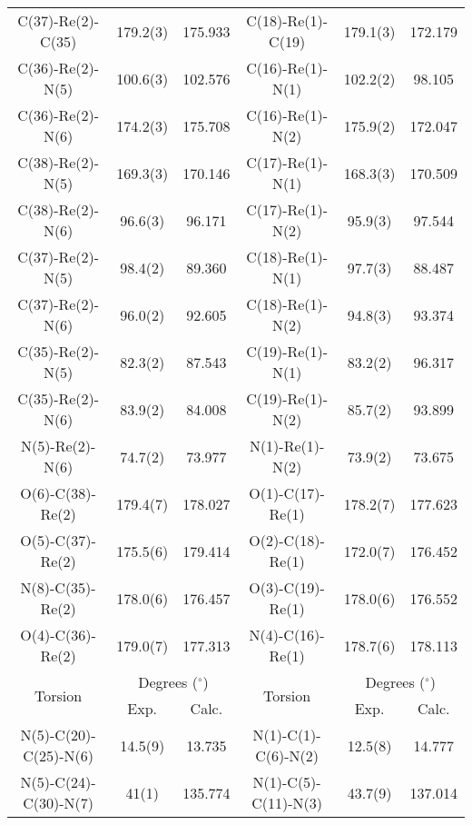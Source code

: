 \begin{table}[htbp]
\begin{tabular}{cccccc}
    C(37)-Re(2)-C(35) & 179.2(3) & 175.933 & C(18)-Re(1)-C(19) & 179.1(3) & 172.179 \\
    C(36)-Re(2)-N(5) & 100.6(3) & 102.576 & C(16)-Re(1)-N(1) & 102.2(2) & 98.105 \\
    C(36)-Re(2)-N(6) & 174.2(3) & 175.708 & C(16)-Re(1)-N(2) & 175.9(2) & 172.047 \\
    C(38)-Re(2)-N(5) & 169.3(3) & 170.146 & C(17)-Re(1)-N(1) & 168.3(3) & 170.509 \\
    C(38)-Re(2)-N(6) & 96.6(3) & 96.171 & C(17)-Re(1)-N(2) & 95.9(3) & 97.544 \\
    C(37)-Re(2)-N(5) & 98.4(2) & 89.360 & C(18)-Re(1)-N(1) & 97.7(3) & 88.487 \\
    C(37)-Re(2)-N(6) & 96.0(2) & 92.605 & C(18)-Re(1)-N(2) & 94.8(3) & 93.374 \\
    C(35)-Re(2)-N(5) & 82.3(2) & 87.543 & C(19)-Re(1)-N(1) & 83.2(2) & 96.317 \\
    C(35)-Re(2)-N(6) & 83.9(2) & 84.008 & C(19)-Re(1)-N(2) & 85.7(2) & 93.899 \\
    N(5)-Re(2)-N(6) & 74.7(2) & 73.977 & N(1)-Re(1)-N(2) & 73.9(2) & 73.675 \\
    O(6)-C(38)-Re(2) & 179.4(7) & 178.027 & O(1)-C(17)-Re(1) & 178.2(7) & 177.623 \\
    O(5)-C(37)-Re(2) & 175.5(6) & 179.414 & O(2)-C(18)-Re(1) & 172.0(7) & 176.452 \\ 
    N(8)-C(35)-Re(2) & 178.0(6) & 176.457 & O(3)-C(19)-Re(1) & 178.0(6) & 176.552 \\
    O(4)-C(36)-Re(2) & 179.0(7) & 177.313 & N(4)-C(16)-Re(1) & 178.7(6) & 178.113 \\ \midrule
    \multirow{2}{*}{Torsion} & \multicolumn{2}{c}{Degrees ($^\circ$)} & \multirow{2}{*}{Torsion} & \multicolumn{2}{c}{Degrees ($^\circ$)} \\ \cline{2-3} \cline {5-6}
     & Exp. & Calc. & & Exp. & Calc. \\ \midrule
    N(5)-C(20)-C(25)-N(6) & 14.5(9) & 13.735 & N(1)-C(1)-C(6)-N(2) & 12.5(8) & 14.777 \\
    N(5)-C(24)-C(30)-N(7) & 41(1) & 135.774 & N(1)-C(5)-C(11)-N(3) & 43.7(9) & 137.014 \\
    \bottomrule
    \end{tabular}%
  \label{tab.da5}%
\end{table}%


